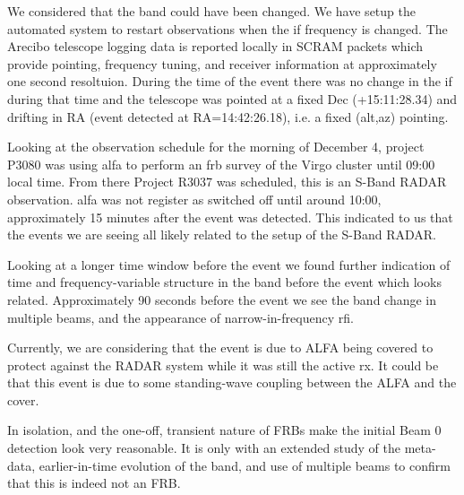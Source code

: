 \documentclass[a4paper,fleqn,usenatbib]{mnras}
\begin{document}

We considered that the band could have been changed. We have setup the automated
system to restart observations when the \gls{if} frequency is changed. The
Arecibo telescope logging data is reported locally in SCRAM packets which
provide pointing, frequency tuning, and receiver information at approximately
one second resoltuion. During the time of the event there was no
change in the \gls{if} during that time and the telescope was pointed at a fixed Dec
(+15:11:28.34) and drifting in RA (event detected at RA=14:42:26.18), i.e. a fixed (alt,az)
pointing.

Looking at the observation schedule for the morning of December 4, project P3080
was using \gls{alfa} to perform an \gls{frb} survey of the Virgo cluster until 09:00 local
time. From there Project R3037 was scheduled, this is an S-Band RADAR
observation. \gls{alfa} was not register as switched off until around
10:00, approximately 15 minutes after the event was detected. This indicated to
us that the events we are seeing all likely related to the setup of the S-Band
RADAR.


Looking at a longer time window before the event we found further indication of
time and frequency-variable structure in the band before the event which looks
related. Approximately 90 seconds before the event we see the band change in
multiple beams, and the appearance of narrow-in-frequency \gls{rfi}.

Currently, we are considering that the event is due to ALFA being covered to
protect against the RADAR system while it was still the active rx. It could be
that this event is due to some standing-wave coupling between the ALFA and the
cover.


In isolation, and the one-off, transient nature of FRBs make the initial Beam 0
detection look very reasonable. It is only with an extended study of the
meta-data, earlier-in-time evolution of the band, and use of multiple beams to
confirm that this is indeed not an FRB.

\end{document}
